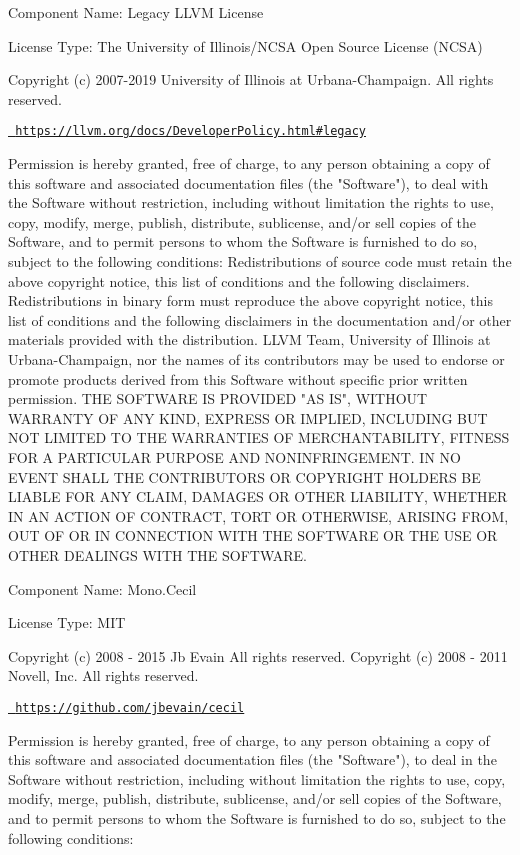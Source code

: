  Component Name\+: Legacy LLVM License

License Type\+: The University of Illinois/\+NCSA Open Source License (NCSA)

Copyright (c) 2007-\/2019 University of Illinois at Urbana-\/\+Champaign. All rights reserved.

\href{https://llvm.org/docs/DeveloperPolicy.html\#legacy}{\texttt{ https\+://llvm.\+org/docs/\+Developer\+Policy.\+html\#legacy}}

Permission is hereby granted, free of charge, to any person obtaining a copy of this software and associated documentation files (the "{}\+Software"{}), to deal with the Software without restriction, including without limitation the rights to use, copy, modify, merge, publish, distribute, sublicense, and/or sell copies of the Software, and to permit persons to whom the Software is furnished to do so, subject to the following conditions\+: Redistributions of source code must retain the above copyright notice, this list of conditions and the following disclaimers. Redistributions in binary form must reproduce the above copyright notice, this list of conditions and the following disclaimers in the documentation and/or other materials provided with the distribution. LLVM Team, University of Illinois at Urbana-\/\+Champaign, nor the names of its contributors may be used to endorse or promote products derived from this Software without specific prior written permission. THE SOFTWARE IS PROVIDED "{}\+AS IS"{}, WITHOUT WARRANTY OF ANY KIND, EXPRESS OR IMPLIED, INCLUDING BUT NOT LIMITED TO THE WARRANTIES OF MERCHANTABILITY, FITNESS FOR A PARTICULAR PURPOSE AND NONINFRINGEMENT. IN NO EVENT SHALL THE CONTRIBUTORS OR COPYRIGHT HOLDERS BE LIABLE FOR ANY CLAIM, DAMAGES OR OTHER LIABILITY, WHETHER IN AN ACTION OF CONTRACT, TORT OR OTHERWISE, ARISING FROM, OUT OF OR IN CONNECTION WITH THE SOFTWARE OR THE USE OR OTHER DEALINGS WITH THE SOFTWARE.

 Component Name\+: Mono.\+Cecil

License Type\+: MIT

Copyright (c) 2008 -\/ 2015 Jb Evain All rights reserved. Copyright (c) 2008 -\/ 2011 Novell, Inc. All rights reserved.

\href{https://github.com/jbevain/cecil}{\texttt{ https\+://github.\+com/jbevain/cecil}}

Permission is hereby granted, free of charge, to any person obtaining a copy of this software and associated documentation files (the "{}\+Software"{}), to deal in the Software without restriction, including without limitation the rights to use, copy, modify, merge, publish, distribute, sublicense, and/or sell copies of the Software, and to permit persons to whom the Software is furnished to do so, subject to the following conditions\+:

